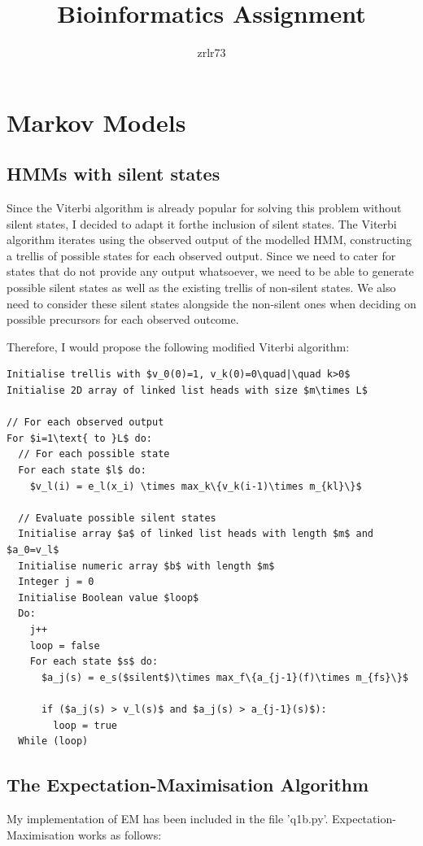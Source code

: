 \documentclass[11pt]{article} %
\title{\vspace{-1.6cm}Bioinformatics Assignment}
\author{zrlr73}
\date{} %
\begin{document}
\maketitle

\section{Markov Models}
\subsection{HMMs with silent states}
Since the Viterbi algorithm is already popular for solving this problem without silent states, I decided to adapt it forthe inclusion of silent states. The Viterbi algorithm iterates using the observed output of the modelled HMM, constructing a trellis of possible states for each observed output. Since we need to cater for states that do not provide any output whatsoever, we need to be able to generate possible silent states as well as the existing trellis of non-silent states. We also need to consider these silent states alongside the non-silent ones when deciding on possible precursors for each observed outcome.

Therefore, I would propose the following modified Viterbi algorithm:
\begin{lstlisting}
Initialise trellis with $v_0(0)=1, v_k(0)=0\quad|\quad k>0$
Initialise 2D array of linked list heads with size $m\times L$

// For each observed output
For $i=1\text{ to }L$ do:
  // For each possible state
  For each state $l$ do:
    $v_l(i) = e_l(x_i) \times max_k\{v_k(i-1)\times m_{kl}\}$

  // Evaluate possible silent states
  Initialise array $a$ of linked list heads with length $m$ and $a_0=v_l$
  Initialise numeric array $b$ with length $m$
  Integer j = 0
  Initialise Boolean value $loop$
  Do:
    j++
    loop = false
    For each state $s$ do:
      $a_j(s) = e_s($silent$)\times max_f\{a_{j-1}(f)\times m_{fs}\}$

      if ($a_j(s) > v_l(s)$ and $a_j(s) > a_{j-1}(s)$):
        loop = true
  While (loop)

\end{lstlisting}

\subsection{The Expectation-Maximisation Algorithm}
My implementation of EM has been included in the file 'q1b.py'. Expectation-Maximisation works as follows:
\end{document}
